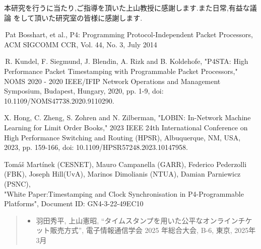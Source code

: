 \documentclass[a4j,11pt]{jreport}
\begin{document}
本研究を行うに当たり,ご指導を頂いた上山教授に感謝します.また日常,有益な議論
をして頂いた研究室の皆様に感謝します.

\begin{thebibliography}{99}
  \footnotesize
  \baselineskip 3.1mm

  \,Pat Bosshart, et al.,
  P4: Programming Protocol-Independent Packet Processors, ACM SIGCOMM CCR, Vol. 44, No. 3, July 2014

  \,R. Kundel, F. Siegmund, J. Blendin, A. Rizk and B. Koldehofe, "P4STA: High Performance Packet Timestamping with Programmable Packet Processors," NOMS 2020 - 2020 IEEE/IFIP Network Operations and Management Symposium, Budapest, Hungary, 2020, pp. 1-9, doi: 10.1109/NOMS47738.2020.9110290.

  X. Hong, C. Zheng, S. Zohren and N. Zilberman, "LOBIN: In-Network Machine Learning for Limit Order Books," 2023 IEEE 24th International Conference on High Performance Switching and Routing (HPSR), Albuquerque, NM, USA, 2023, pp. 159-166, doi: 10.1109/HPSR57248.2023.10147958.

  Tomáš Martínek (CESNET), Mauro Campanella (GARR), Federico Pederzolli (FBK), Joseph Hill(UvA), Marinos Dimolianis (NTUA), Damian Parniewicz (PSNC), \\"White Paper:Timestamping and Clock Synchronisation in P4-Programmable Platforms", Document ID: GN4-3-22-49EC10
\end{thebibliography}

\begin{quote}
  \begin{itemize}
    \item
          羽田秀平, 上山憲昭, “タイムスタンプを用いた公平なオンラインチケット販売方式”, 電子情報通信学会 2025 年総合大会, B-6, 東京, 2025年3月
  \end{itemize}
\end{quote}
\end{document}
